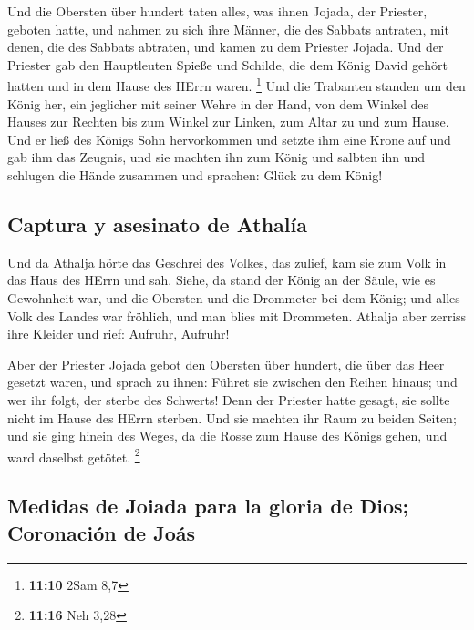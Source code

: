  Und die Obersten über hundert taten alles, was ihnen
Jojada, der Priester, geboten hatte, und nahmen zu sich ihre Männer, die
des Sabbats antraten, mit denen, die des Sabbats abtraten, und kamen zu
dem Priester Jojada.  Und der Priester gab den
Hauptleuten Spieße und Schilde, die dem König David gehört hatten und in
dem Hause des HErrn waren. \footnote{\textbf{11:10} 2Sam 8,7}
 Und die Trabanten standen um den König her, ein
jeglicher mit seiner Wehre in der Hand, von dem Winkel des Hauses zur
Rechten bis zum Winkel zur Linken, zum Altar zu und zum Hause.
 Und er ließ des Königs Sohn hervorkommen und setzte ihm
eine Krone auf und gab ihm das Zeugnis, und sie machten ihn zum König
und salbten ihn und schlugen die Hände zusammen und sprachen: Glück zu
dem König!

\hypertarget{captura-y-asesinato-de-athaluxeda}{%
\subsection{Captura y asesinato de
Athalía}\label{captura-y-asesinato-de-athaluxeda}}

 Und da Athalja hörte das Geschrei des Volkes, das
zulief, kam sie zum Volk in das Haus des HErrn  und sah.
Siehe, da stand der König an der Säule, wie es Gewohnheit war, und die
Obersten und die Drommeter bei dem König; und alles Volk des Landes war
fröhlich, und man blies mit Drommeten. Athalja aber zerriss ihre Kleider
und rief: Aufruhr, Aufruhr!

 Aber der Priester Jojada gebot den Obersten über
hundert, die über das Heer gesetzt waren, und sprach zu ihnen: Führet
sie zwischen den Reihen hinaus; und wer ihr folgt, der sterbe des
Schwerts! Denn der Priester hatte gesagt, sie sollte nicht im Hause des
HErrn sterben.  Und sie machten ihr Raum zu beiden
Seiten; und sie ging hinein des Weges, da die Rosse zum Hause des Königs
gehen, und ward daselbst getötet. \footnote{\textbf{11:16} Neh 3,28}

\hypertarget{medidas-de-joiada-para-la-gloria-de-dios-coronaciuxf3n-de-jouxe1s}{%
\subsection{Medidas de Joiada para la gloria de Dios; Coronación de
Joás}\label{medidas-de-joiada-para-la-gloria-de-dios-coronaciuxf3n-de-jouxe1s}}

